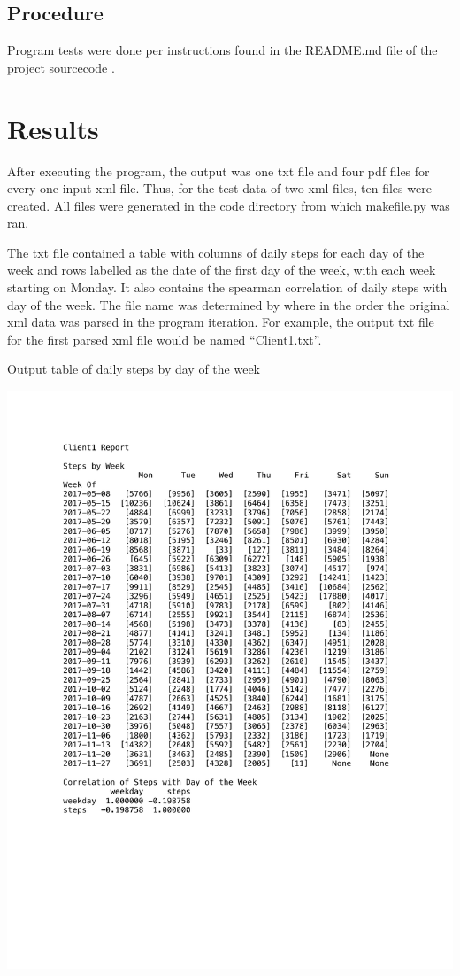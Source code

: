 \documentclass[sigconf]{acmart}
\begin{document}
\subsection{Procedure}

Program tests were done per instructions found in the README.md file of the project sourcecode \cite{sourcecode}.

\section{Results}
After executing the program, the output was one txt file and four pdf files for every one input xml file. Thus, for the test data of two xml files, ten files were created. All files were generated in the code directory from which makefile.py was ran. 

The txt file contained a table with columns of daily steps for each day of the week and rows labelled as the date of the first day of the week, with each week starting on Monday. It also contains the spearman correlation of daily steps with day of the week. The file name was determined by where in the order the original xml data was parsed in the program iteration. For example, the output txt file for the first parsed xml file would be named ``Client1.txt''.

\begin{table}[htb]
\caption{Output table of daily steps by day of the week}
\includegraphics[width=\textwidth]{images/Client1.pdf}
\end{table}
\end{document}
